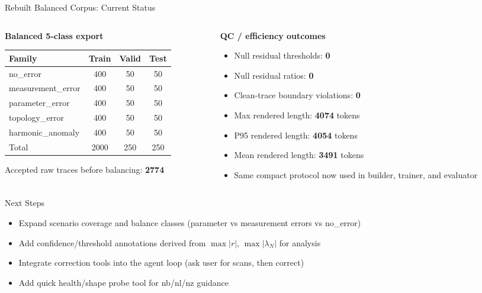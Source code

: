 \documentclass{beamer}
\begin{document}
\begin{frame}{Rebuilt Balanced Corpus: Current Status}
  \begin{columns}[T]
    \begin{column}{0.54\textwidth}
      \textbf{Balanced 5-class export}
      \begin{center}
      \begin{tabular}{lccc}
        \toprule
        Family & Train & Valid & Test \\
        \midrule
        no\_error & 400 & 50 & 50 \\
        measurement\_error & 400 & 50 & 50 \\
        parameter\_error & 400 & 50 & 50 \\
        topology\_error & 400 & 50 & 50 \\
        harmonic\_anomaly & 400 & 50 & 50 \\
        \midrule
        Total & 2000 & 250 & 250 \\
        \bottomrule
      \end{tabular}
      \end{center}
      \vspace{0.4em}
      Accepted raw traces before balancing: \textbf{2774}
    \end{column}
    \begin{column}{0.44\textwidth}
      \textbf{QC / efficiency outcomes}
      \begin{itemize}
        \item Null residual thresholds: \textbf{0}
        \item Null residual ratios: \textbf{0}
        \item Clean-trace boundary violations: \textbf{0}
        \item Max rendered length: \textbf{4074} tokens
        \item P95 rendered length: \textbf{4054} tokens
        \item Mean rendered length: \textbf{3491} tokens
        \item Same compact protocol now used in builder, trainer, and evaluator
      \end{itemize}
    \end{column}
  \end{columns}
\end{frame}

\begin{frame}{Next Steps}
  \begin{itemize}
    \item Expand scenario coverage and balance classes (parameter vs measurement errors vs no\_error)
    \item Add confidence/threshold annotations derived from $\max|r|$, $\max|\lambda_N|$ for analysis
    \item Integrate correction tools into the agent loop (ask user for scans, then correct)
    \item Add quick health/shape probe tool for nb/nl/nz guidance
  \end{itemize}
\end{frame}
\end{document}
